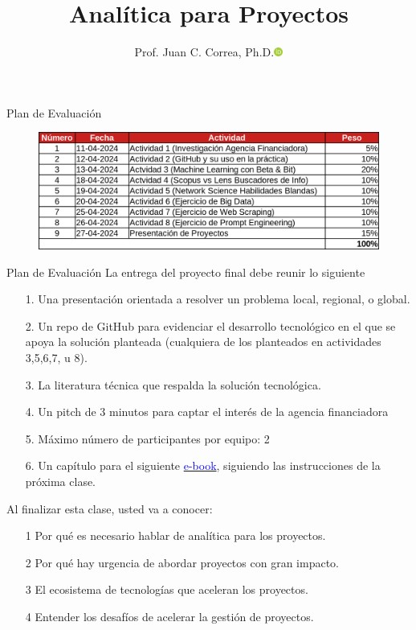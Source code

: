 \documentclass[aspectratio=169]{beamer}
\title[Analítica para Proyectos]{Analítica para Proyectos}
\author[Juan C. Correa (\url{https://correajc.com/})]{Prof. Juan C. Correa, Ph.D.\href{https://orcid.org/0000-0002-0301-5641}{\includegraphics[width=0.3cm]{orcid.png}}}
\institute[]{Maestría en Estructuración Ágil de Proyectos de Alta Complejidad\\
Universidad del Rosario\\
\Email  \href{mailto:juanca.correa@urosario.edu.co}{\color{blue}juanca.correa@urosario.edu.co}
}
\date[\initclock
\quad\cronominutes\pdfcolon\cronoseconds ~~Bogotá, Abril 11, 2024] %
{}
\begin{document}
\frame{\titlepage}

\begin{frame}{Plan de Evaluación}
\begin{figure}
\includegraphics[width=.9\textwidth]{evaluaciones.png}
\end{figure}   
\end{frame}

\begin{frame}{Plan de Evaluación}
La entrega del proyecto final debe reunir lo siguiente
\begin{itemize}
\item[1.]  Una presentación orientada a resolver un problema local, regional, o global.
\item[2.] Un repo de GitHub para evidenciar el desarrollo tecnológico en el que se apoya la solución planteada (cualquiera de los planteados en actividades 3,5,6,7, u 8).
\item[3.] La literatura técnica que respalda la solución tecnológica.
\item[4.] Un pitch de 3 minutos para captar el interés de la agencia financiadora 
\item[5.] Máximo número de participantes por equipo: 2  
\item[6.] Un capítulo para el siguiente \href{https://apgpac.netlify.app/}{\textcolor{blue}{e-book}}, siguiendo las instrucciones de la próxima clase.
\end{itemize}
\end{frame}



\begin{frame}
\begin{block}{Al finalizar esta clase, usted va a conocer:}
\vspace{.2cm}
\begin{itemize}
\item[\textcolor{ccdark}{1}] Por qué es necesario hablar de analítica para los proyectos. 
\vspace{.2cm}
\item[\textcolor{ccdark}{2}] Por qué hay urgencia de abordar proyectos con gran impacto.
\vspace{.2cm}
\item[\textcolor{ccdark}{3}] El ecosistema de tecnologías que aceleran los proyectos.
\vspace{.2cm}
\item[\textcolor{ccdark}{4}] Entender los desafíos de acelerar la gestión de proyectos.
\end{itemize}    
\end{block}
\end{frame}
\end{document}
